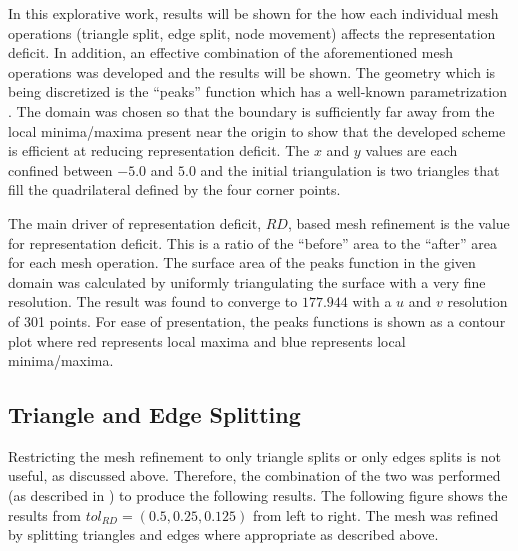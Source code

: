 In this explorative work, results will be shown for the how each
individual mesh operations (triangle split, edge split, node movement)
affects the representation deficit. In addition, an effective
combination of the aforementioned mesh operations was developed and the
results will be shown. The geometry which is being discretized is the
``peaks'' function which has a well-known parametrization
\cite{peaksMatlab}. The domain was chosen so that the boundary is
sufficiently far away from the local minima/maxima present near the origin to
show that the developed scheme is efficient at reducing representation
deficit. The $x$ and $y$ values are each confined between $-5.0$ and
$5.0$ and the initial triangulation is two triangles that fill the
quadrilateral defined by the four corner points.

The main driver of representation deficit, $RD$, based mesh refinement
is the value for representation deficit. This is a ratio of the
``before'' area to the ``after'' area for each mesh operation. The
surface area of the peaks function in the given domain was calculated by
uniformly triangulating the surface with a very fine resolution. The
result was found to converge to $177.944$ with a $u$ and $v$ resolution
of 301 points. For ease of presentation, the peaks functions is shown as
a contour plot where red represents local maxima and blue represents
local minima/maxima.

\subsection{Triangle and Edge Splitting}
Restricting the mesh refinement to only triangle splits or only edges
splits is not useful, as discussed above. Therefore, the combination of
the two was performed (as described in )
to produce the following results. The following figure shows the results
from $tol_{RD}=\left(0.5,0.25,0.125\right)$ from left to right. The mesh was
refined by splitting triangles and edges where appropriate as described
above.

